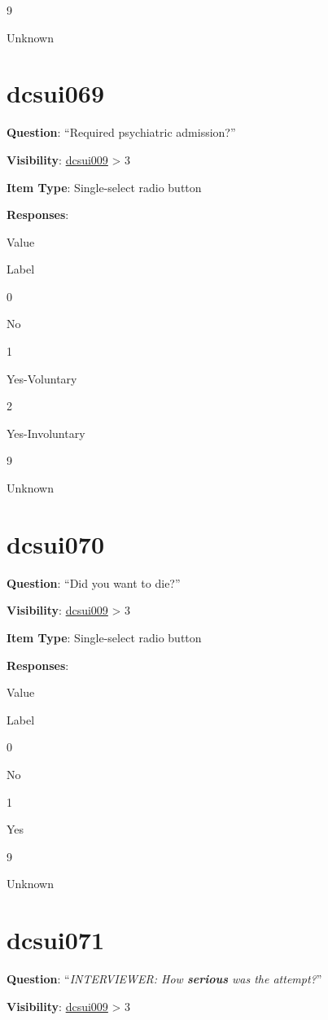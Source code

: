 \documentclass[]{book}
\begin{document}
9

Unknown

\hypertarget{dcsui069}{%
\section{dcsui069}\label{dcsui069}}

\textbf{Question}: ``Required psychiatric admission?''

\textbf{Visibility}: \protect\hyperlink{dcsui009}{dcsui009} \textgreater{} 3

\textbf{Item Type}: Single-select radio button

\textbf{Responses}:

Value

Label

0

No

1

Yes-Voluntary

2

Yes-Involuntary

9

Unknown

\hypertarget{dcsui070}{%
\section{dcsui070}\label{dcsui070}}

\textbf{Question}: ``Did you want to die?''

\textbf{Visibility}: \protect\hyperlink{dcsui009}{dcsui009} \textgreater{} 3

\textbf{Item Type}: Single-select radio button

\textbf{Responses}:

Value

Label

0

No

1

Yes

9

Unknown

\hypertarget{dcsui071}{%
\section{dcsui071}\label{dcsui071}}

\textbf{Question}: ``\emph{INTERVIEWER: How \textbf{serious} was the attempt?}''

\textbf{Visibility}: \protect\hyperlink{dcsui009}{dcsui009} \textgreater{} 3
\end{document}
